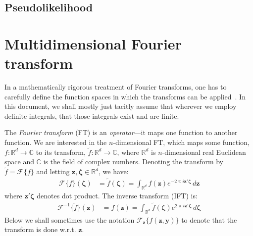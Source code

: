 \documentclass[a4paper,oneside,12pt,english]{report}
\def\zvec{\mathbf{z}}
\def\R{\mathbb{R}}
\def\yvec{\mathbf{y}}
\def\funcdef#1#2#3{#1:#2\to#3}
\def\Fset{\mathcal{F}}
\def\C{\mathbb{C}}
\newcommand\FT[2][]{\Fset_{#1}\{#2\}}
\def\IFT#1{\Fset^{-1}\{#1\}}
\begin{document}
\section{Pseudolikelihood}


\appendix



\chapter{Multidimensional Fourier transform}
\label{chap:MDFT}
\def\zetavec{\boldsymbol{\zeta}}
In a mathematically rigorous treatment of Fourier transforms, one has to carefully define the function spaces in which the transforms can be applied~\cite{SteinWeiss}. In this document, we shall mostly just tacitly assume that wherever we employ definite integrals, that those integrals exist and are finite.

The \emph{Fourier transform} (FT) is an \emph{operator}---it maps one function to another function. We are interested in the $n$-dimensional FT, which maps some function, $\funcdef{f}{\R^d}{\C}$ to its transform, $\funcdef{\tilde f}{\R^d}{\C}$, where $\R^d$ is $n$-dimensional real Euclidean space and $\C$ is the field of complex numbers. Denoting the transform by $\tilde f = \FT{f}$ and letting $\zvec,\zetavec\in\R^d$, we have:
\begin{align}
\label{eq:FT}
\FT{f}(\zetavec) &= \tilde f(\zetavec) = \int_{\R^d} f(\zvec)e^{-2\uppi i\zvec'\zetavec}\,d\zvec
\end{align}
where $\zvec'\zetavec$ denotes dot product. The inverse transform (IFT) is:
\begin{align}
\IFT{\tilde f}(\zvec) &= f(\zvec) = \int_{\R^d} \tilde f(\zetavec)e^{2\uppi i\zvec'\zetavec}\,d\zetavec
\end{align}
Below we shall sometimes use the notation $\FT[\zvec]{f(\zvec,\yvec)}$ to denote that the transform is done w.r.t. $\zvec$.
\end{document}
